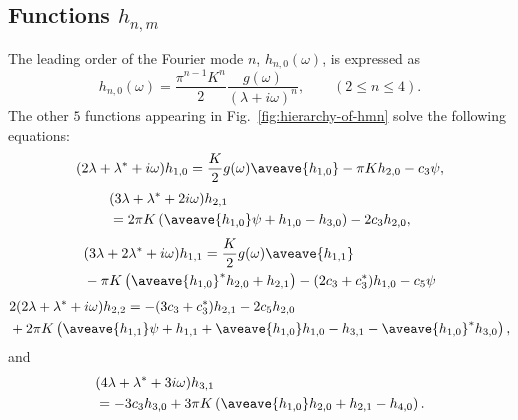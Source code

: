 \subsection{Functions $h_{n,m}$}
The leading order of the Fourier mode $n$, $h_{n,0}(\omega)$, is expressed as
\begin{equation}
  \label{eq:hn0}
  h_{n,0}(\omega) = \dfrac{\pi^{n-1}K^{n}}{2} \dfrac{g(\omega)}{(\lambda+i\omega)^{n}},
  \qquad (2\leq n\leq 4).
\end{equation}
The other $5$ functions appearing in Fig.~\ref{fig:hierarchy-of-hmn}
solve the following equations:
\begin{equation}
  (2\lambda + \lambda^{\ast}+i\omega) h_{1,0}
  = \dfrac{K}{2} g(\omega) \aveave{h_{1,0}} - \pi K h_{2,0} - c_{3} \psi,
\end{equation}
\begin{equation}
  \begin{split}
    & (3\lambda + \lambda^{\ast}+2i\omega) h_{2,1} \\
    & = 2\pi K \left( \aveave{h_{1,0}} \psi + h_{1,0} - h_{3,0} \right)
    - 2c_{3} h_{2,0},
  \end{split}
\end{equation}
\begin{equation}
  \begin{split}
    & (3\lambda + 2\lambda^{\ast}+i\omega) h_{1,1}
    = \dfrac{K}{2} g(\omega) \aveave{h_{1,1}} \\
    & - \pi K \left( \aveave{h_{1,0}}^{\ast} h_{2,0} + h_{2,1} \right)
    - (2c_{3}+c_{3}^{\ast}) h_{1,0} - c_{5} \psi
  \end{split}
\end{equation}
\begin{equation}
  \begin{split}
    & 2(2\lambda + \lambda^{\ast}+i\omega) h_{2,2}
    = - (3c_{3}+c_{3}^{\ast}) h_{2,1} - 2c_{5} h_{2,0} \\
    & + 2\pi K \left( \aveave{h_{1,1}} \psi + h_{1,1} + \aveave{h_{1,0}} h_{1,0}
      - h_{3,1} - \aveave{h_{1,0}}^{\ast} h_{3,0}  \right),
  \end{split}
\end{equation}
and
\begin{equation}
  \begin{split}
    & (4\lambda + \lambda^{\ast}+3i\omega) h_{3,1} \\
    & = - 3c_{3} h_{3,0} + 3\pi K \left( \aveave{h_{1,0}} h_{2,0} + h_{2,1} - h_{4,0} \right).
  \end{split}
\end{equation}

